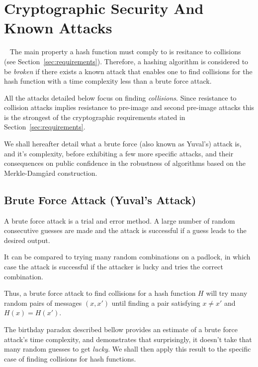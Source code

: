 \chapter{Cryptographic Security And Known Attacks}~\label{chap:security}
The main property a hash function must comply to is resitance to collisions (see Section~\ref{sec:requirements}). Therefore, a hashing algorithm is considered to be \emph{broken} if there exists a known attack that enables one to find collisions for the hash function with a time complexity less than a brute force attack.

All the attacks detailed below focus on finding \emph{collisions}. Since resistance to collision attacks implies resistance to pre-image and second pre-image attacks this is the strongest of the cryptographic requirements stated in Section~\ref{sec:requirements}.

We shall hereafter detail what a brute force (also known as Yuval's) attack is, and it's complexity, before exhibiting a few more specific attacks, and their consequences on public confidence in the robustness of algorithms based on the Merkle-Damg\r{a}rd construction.

\section{Brute Force Attack (Yuval's Attack)}
A brute force attack is a trial and error method. A large number of random consecutive guesses are made and the attack is successful if a guess leads to the desired output.

It can be compared to trying many random combinations on a padlock, in which case the attack is successful if the attacker is lucky and tries the correct combination.

Thus, a brute force attack to find collisions for a hash function $H$ will try many random pairs of messages $ (x,x')$ until finding a pair satisfying $x\ne x' $ and $H(x) = H(x')$.

The birthday paradox described bellow provides an estimate of a brute force attack's time complexity, and demonstrates that surprisingly, it doesn't take that many random guesses to get \emph{lucky}. We shall then apply this result to the specific case of finding collisions for hash functions.

